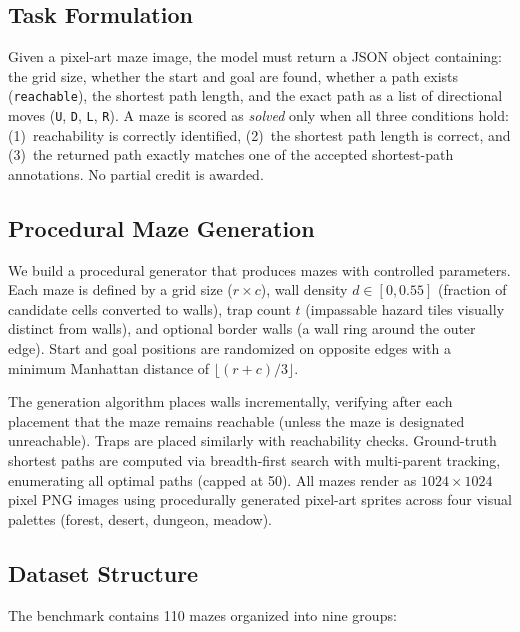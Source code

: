 \documentclass[11pt]{article}
\begin{document}
\subsection{Task Formulation}

Given a pixel-art maze image, the model must return a JSON object containing: the grid size, whether the start and goal are found, whether a path exists (\texttt{reachable}), the shortest path length, and the exact path as a list of directional moves (\texttt{U}, \texttt{D}, \texttt{L}, \texttt{R}).
A maze is scored as \emph{solved} only when all three conditions hold: (1)~reachability is correctly identified, (2)~the shortest path length is correct, and (3)~the returned path exactly matches one of the accepted shortest-path annotations.
No partial credit is awarded.

\subsection{Procedural Maze Generation}

We build a procedural generator that produces mazes with controlled parameters.
Each maze is defined by a grid size ($r \times c$), wall density $d \in [0, 0.55]$ (fraction of candidate cells converted to walls), trap count $t$ (impassable hazard tiles visually distinct from walls), and optional border walls (a wall ring around the outer edge).
Start and goal positions are randomized on opposite edges with a minimum Manhattan distance of $\lfloor(r+c)/3\rfloor$.

The generation algorithm places walls incrementally, verifying after each placement that the maze remains reachable (unless the maze is designated unreachable).
Traps are placed similarly with reachability checks.
Ground-truth shortest paths are computed via breadth-first search with multi-parent tracking, enumerating all optimal paths (capped at 50).
All mazes render as $1024 \times 1024$ pixel PNG images using procedurally generated pixel-art sprites across four visual palettes (forest, desert, dungeon, meadow).

\subsection{Dataset Structure}

The benchmark contains 110 mazes organized into nine groups:
\end{document}
